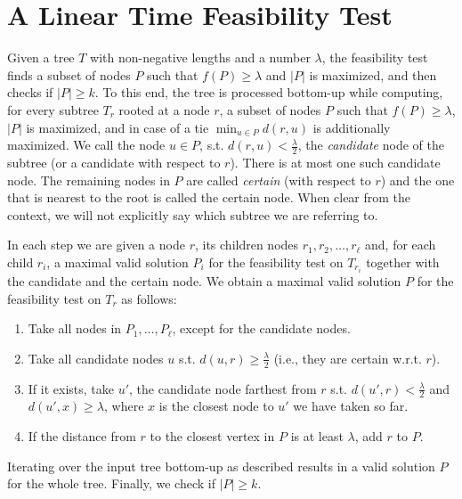 \documentclass[a4paper,UKenglish]{lipics-v2016}
\theoremstyle{plain}
\begin{document}
\section{A Linear Time Feasibility Test}
\label{linear F.T.}

Given a tree $T$ with non-negative lengths and a number $\lambda$, the feasibility test finds a subset of nodes $P$ such that $f(P)\geq\lambda$
and $|P|$ is maximized, and then checks if $|P|\geq k$.
To this end, the tree is processed bottom-up while computing, for every subtree $T_{r}$ rooted at a node $r$, a subset of nodes $P$ such that
$f(P)\geq\lambda$, $|P|$ is maximized, and in case of a tie $\min_{u\in P}d(r,u)$ is additionally maximized.
We call the node $u\in P$, s.t. $d(r,u)<\frac{\lambda}{2}$, the \emph{candidate} node of the subtree (or a candidate with respect to $r$). There is at most one such candidate node.
The remaining nodes in $P$ are called \emph{certain} (with respect to $r$) and the one that is nearest to the root is called the certain node.
When clear from the context, we will not explicitly say which subtree we are referring to.

In each step we are given a node $r$, its children nodes $r_{1},r_{2},\ldots,r_{\ell}$ and, for each child $r_{i}$, a maximal valid
solution $P_{i}$ for the feasibility test on $T_{r_{i}}$ together with the candidate and the certain node. We obtain a maximal valid solution $P$ for the feasibility test on $T_{r}$ as follows:
\begin{enumerate}
\item Take all nodes in $P_{1},\ldots,P_{\ell}$, except for the candidate nodes.\label{linear time step 1}
\item Take all candidate nodes $u$ s.t. $d(u,r) \geq \frac{\lambda}{2}$ (i.e., they are certain w.r.t. $r$).\label{linear time step 2}
\item If it exists, take $u'$, the candidate node farthest from $r$ s.t. $d(u',r) < \frac{\lambda}{2}$ and $d(u',x)\geq \lambda$, where $x$ is the closest node to $u'$ we have taken so far.\label{linear time step 3}
\item If the distance from $r$ to the closest vertex in $P$ is at least $\lambda$, add $r$ to $P$.\label{linear time step 4}
\end{enumerate}
Iterating over the input tree bottom-up as described results in a valid solution $P$ for the whole tree. Finally, we check if $|P|\geq k$.
\end{document}
